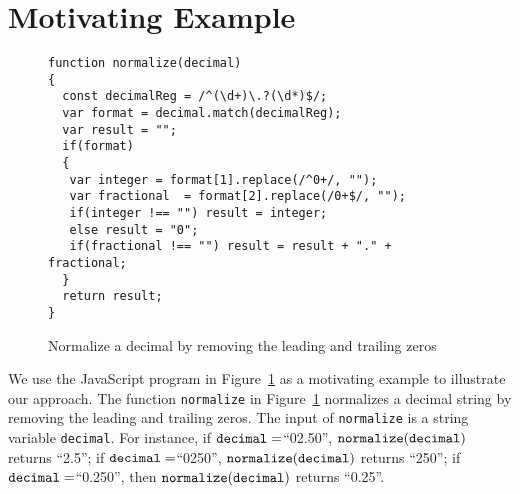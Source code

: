 
\section{Motivating Example}\label{sec:mot}

\begin{figure}[htbp]
\begin{center}
\begin{verbatim}
function normalize(decimal)
{
  const decimalReg = /^(\d+)\.?(\d*)$/;
  var format = decimal.match(decimalReg);
  var result = "";
  if(format)
  {
   var integer = format[1].replace(/^0+/, "");
   var fractional  = format[2].replace(/0+$/, "");
   if(integer !== "") result = integer;
   else result = "0"; 
   if(fractional !== "") result = result + "." + fractional;
  }
  return result;
}
\end{verbatim}
\end{center}
\caption{Normalize a decimal by removing the leading and trailing zeros}
\label{fig-run-exmp}
\end{figure}

We use the JavaScript program in Figure~\ref{fig-run-exmp} as a motivating example to illustrate our approach. 
The function {\tt normalize}  in Figure~\ref{fig-run-exmp} normalizes a decimal string by removing the leading and trailing zeros. The input of {\tt normalize} is a string variable {\tt decimal}. For instance,  if $\tt{decimal} =$``02.50'', $\tt{normalize(decimal)}$ returns ``2.5''; if $\tt{decimal} =$``0250'', $\tt{normalize(decimal)}$ returns ``250''; if $\tt{decimal} =$``0.250'', then $\tt{normalize(decimal)}$ returns ``0.25''. 


